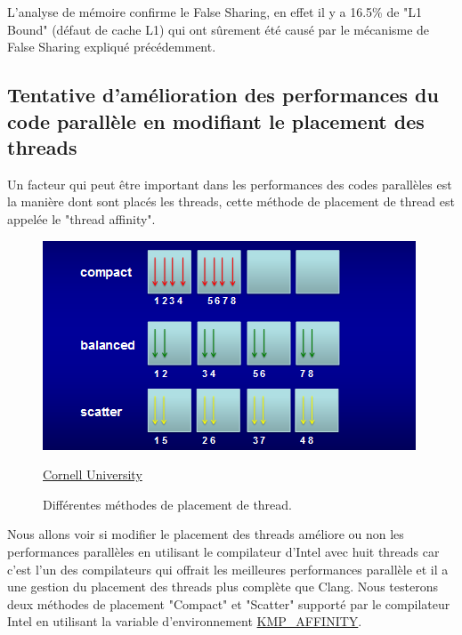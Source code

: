\documentclass[
 aip,
 jmp,
 amsmath,amssymb,
 reprint
]{revtex4-1}
\begin{document}
L'analyse de mémoire confirme le False Sharing\pageref{Fig:false_sharing}, en effet il y a 16.5\% de "L1 Bound" (défaut de cache L1) qui ont sûrement été causé par le mécanisme de False Sharing expliqué précédemment.

\subsection{Tentative d'amélioration des performances du code parallèle en modifiant le placement des threads}

Un facteur qui peut être important dans les performances des codes parallèles est la manière dont sont placés les threads, cette méthode de placement de thread est appelée le "thread affinity".

\begin{figure}[H]
  \includegraphics[width=\linewidth, keepaspectratio=true]{affinity.png}
  \centering
  \caption{Différentes méthodes de placement de thread. \label{Fig:affinity}}{\href{https://cvw.cac.cornell.edu/mic/affinity}{Cornell University}}
\end{figure}

Nous allons voir si modifier le placement des threads améliore ou non les performances parallèles en utilisant le compilateur d'Intel avec huit threads car c'est l'un des compilateurs qui offrait les meilleures performances parallèle et il a une gestion du placement des threads plus complète que Clang. Nous testerons deux méthodes de placement "Compact" et "Scatter"\pageref{Fig:affinity} supporté par le compilateur Intel en utilisant la variable d'environnement \href{https://software.intel.com/en-us/node/522691}{KMP\_AFFINITY}.
\end{document}

